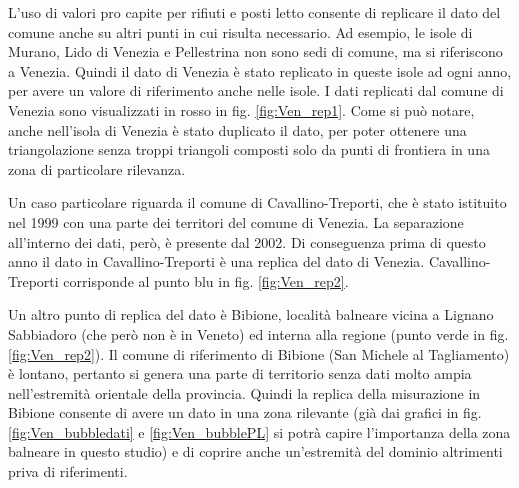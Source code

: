\documentclass[a4paper,11pt,twoside,openright]{book}							%
\begin{document}
L'uso di valori pro capite per rifiuti e posti letto consente di replicare il dato del comune anche su altri punti in cui risulta necessario. Ad esempio, le isole di Murano, Lido di Venezia e Pellestrina non sono sedi di comune, ma si riferiscono a Venezia. Quindi il dato di Venezia è stato replicato in queste isole ad ogni anno, per avere un valore di riferimento anche nelle isole. I dati replicati dal comune di Venezia sono visualizzati in rosso in fig. \ref{fig:Ven_rep1}. Come si può notare, anche nell'isola di Venezia è stato duplicato il dato, per poter ottenere una triangolazione senza troppi triangoli composti solo da punti di frontiera in una zona di particolare rilevanza. 

Un caso particolare riguarda il comune di Cavallino-Treporti, che è stato istituito nel 1999 con una parte dei territori del comune di Venezia. La separazione all'interno dei dati, però, è presente dal 2002. Di conseguenza prima di questo anno il dato in Cavallino-Treporti è una replica del dato di Venezia. Cavallino-Treporti corrisponde al punto blu in fig. \ref{fig:Ven_rep2}.

Un altro punto di replica del dato è Bibione, località balneare vicina a Lignano Sabbiadoro (che però non è in Veneto) ed interna alla regione (punto verde in fig. \ref{fig:Ven_rep2}). Il comune di riferimento di Bibione (San Michele al Tagliamento) è lontano, pertanto si genera una parte di territorio senza dati molto ampia nell'estremità orientale della provincia. Quindi la replica della misurazione in Bibione consente di avere un dato in una zona rilevante (già dai grafici in fig. \ref{fig:Ven_bubbledati} e \ref{fig:Ven_bubblePL} si potrà capire l'importanza della zona balneare in questo studio) e di coprire anche un'estremità del dominio altrimenti priva di riferimenti.
\end{document}
